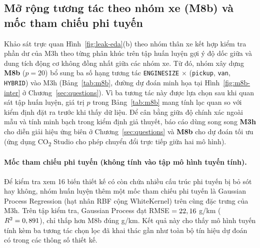 \subsection{Mở rộng tương tác theo nhóm xe (M8b) và mốc tham chiếu phi tuyến}
Khảo sát trực quan Hình~\ref{fig:leak-eda}(b) theo nhóm thân xe kết hợp kiểm tra phần dư của M3h theo từng phân khúc trên tập huấn luyện gợi ý độ dốc giữa \COtwo{} và dung tích động cơ không đồng nhất giữa các nhóm xe. Từ đó, nhóm xây dựng \textbf{M8b} ($p = 20$) bổ sung ba số hạng tương tác \texttt{ENGINESIZE} $\times$ (\texttt{pickup}, \texttt{van}, \texttt{HYBRID}) vào M3h (Bảng~\ref{tab:m8b}, đường dự đoán minh họa tại Hình~\ref{fig:m8b-inter} ở Chương~\ref{sec:questions}). Vì ba tương tác này được lựa chọn sau khi quan sát tập huấn luyện, giá trị $p$ trong Bảng~\ref{tab:m8b} mang tính lạc quan so với kiểm định đặt ra trước khi thấy dữ liệu. Để cân bằng giữa độ chính xác ngoài mẫu và tính minh bạch trong kiểm định giả thuyết, báo cáo dùng song song \textbf{M3h} cho diễn giải hiệu ứng biên ở Chương~\ref{sec:questions} và \textbf{M8b} cho dự đoán tối ưu (ứng dụng CO\textsubscript{2} Studio cho phép chuyển đổi trực tiếp giữa hai mô hình).

\begin{table}[htbp]
  \centering
  \caption{Ước lượng các số hạng tương tác trong M8b trên tập huấn luyện (SE HC3; giá trị $p$ lạc quan do chọn tương tác trên tập train).}
  \label{tab:m8b}
  \small
  \setlength{\tabcolsep}{5pt}
  
\end{table}

\paragraph{Mốc tham chiếu phi tuyến (không tính vào tập mô hình tuyến tính).}
Để kiểm tra xem 16 biến thiết kế có còn chứa nhiều cấu trúc phi tuyến bị bỏ sót hay không, nhóm huấn luyện thêm một mốc tham chiếu phi tuyến là Gaussian Process Regression (hạt nhân RBF cộng WhiteKernel) trên cùng đặc trưng của M3h. Trên tập kiểm tra, Gaussian Process đạt RMSE $= 22,16$ g/km ($R^2 = 0,891$), chỉ thấp hơn M8b đúng \gpGapEightB{} g/km. Kết quả này cho thấy mô hình tuyến tính kèm ba tương tác chọn lọc đã khai thác gần như toàn bộ tín hiệu dự đoán có trong các thông số thiết kế.
